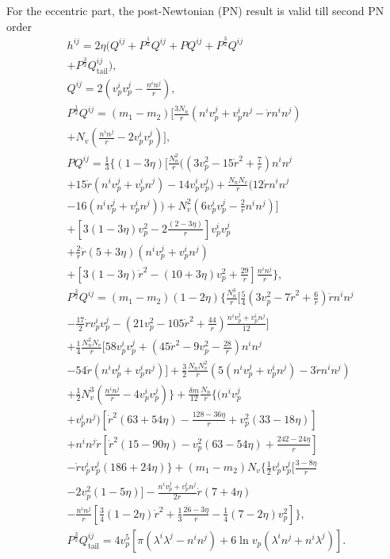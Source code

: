 \documentclass[prd,aps,a4paper,superscriptaddress,twocolumn,footinbib,showpacs]{revtex4}
\begin{document}
For the eccentric part, the post-Newtonian (PN) result is valid till second PN order \cite{PhysRevD.54.4813}
\begin{align}
&h^{ij}=2\eta(Q^{ij}+P^{\frac{1}{2}}Q^{ij}+PQ^{ij}
+P^{\frac{3}{2}}Q^{ij}\nonumber\\
&+P^{\frac{3}{2}}Q_{\text{tail}}^{ij}),\label{ewaveb}\\
&Q^{ij}=2(v_p^iv_p^j-\frac{n^in^j}{r}),\\
&P^{\frac{1}{2}}Q^{ij}=(m_1-m_2)[\frac{3N_n}{r}(n^iv_p^j+v_p^in^j-\dot{r}n^in^j)\nonumber\\
&+N_v(\frac{n^in^j}{r}-2v_p^iv_p^j)],\\
&PQ^{ij}=\frac{1}{3}\{(1-3\eta)[\frac{N_n^2}{r}((3v_p^2-15\dot{r}^2+\frac{7}{r})n^in^j\nonumber\\
&+15\dot{r}(n^iv_p^j+v_p^in^j)-14v_p^iv_p^j)
+\frac{N_nN_v}{r}(12\dot{r}n^in^j\nonumber\\
&-16(n^iv_p^j+v_p^in^j))+N_v^2(6v_p^iv_p^j-\frac{2}{r}n^in^j)]\nonumber\\
&+[3(1-3\eta)v_p^2-2\frac{(2-3\eta)}{r}]v_p^iv_p^j\nonumber\\
&+\frac{2}{r}\dot{r}(5+3\eta)(n^iv_p^j+v_p^in^j)\nonumber\\
&+[3(1-3\eta)\dot{r}^2-(10+3\eta)v_p^2+\frac{29}{r}]\frac{n^in^j}{r}\},\\
&P^{\frac{3}{2}}Q^{ij}=(m_1-m_2)(1-2\eta)\{\frac{N_n^3}{r}[\frac{5}{4}
(3v_p^2-7\dot{r}^2+\frac{6}{r})\dot{r}n^in^j\nonumber\\
&-\frac{17}{2}\dot{r}v_p^iv_p^j-(21v_p^2-105\dot{r}^2
+\frac{44}{r})\frac{n^iv_p^j+v_p^in^j}{12}]\nonumber\\
&+\frac{1}{4}\frac{N_n^2N_v}{r}[58v_p^iv_p^j+(45\dot{r}^2-9v_p^2-\frac{28}{r})n^in^j\nonumber\\
&-54\dot{r}(n^iv_p^j+v_p^in^j)]
+\frac{3}{2}\frac{N_nN_v^2}{r}(5(n^iv_p^j+v_p^in^j)-3\dot{r}n^in^j)\nonumber\\
&+\frac{1}{2}N_v^3(\frac{n^in^j}{r}-4v_p^iv_p^j)\}+\frac{\delta m}{12}\frac{N_n}{r}\{(n^iv_p^j\nonumber\\
&+v_p^in^j)[\dot{r}^2(63+54\eta)-\frac{128-36\eta}{r}
+v_p^2(33-18\eta)]\nonumber\\
&+n^in^j\dot{r}[\dot{r}^2(15-90\eta)-v_p^2(63-54\eta)+\frac{242-24\eta}{r}]\nonumber\\
&-\dot{r}v_p^iv_p^j(186+24\eta)\}+(m_1-m_2)N_v\{\frac{1}{2}v_p^iv_p^j[\frac{3-8\eta}{r}\nonumber\\
&-2v_p^2(1-5\eta)]-\frac{n^iv_p^j+v_p^in^j}{2r}\dot{r}(7+4\eta)\nonumber\\
&-\frac{n^in^j}{r}[\frac{3}{4}(1-2\eta)\dot{r}^2
+\frac{1}{3}\frac{26-3\eta}{r}-\frac{1}{4}(7-2\eta)v_p^2]\},\\
&P^{\frac{3}{2}}Q_{\text{tail}}^{ij}=4v_p^5[\pi(\lambda^i\lambda^j-n^in^j)
+6\ln{v_p}(\lambda^in^j+n^i\lambda^j)].
\end{align}
\end{document}
